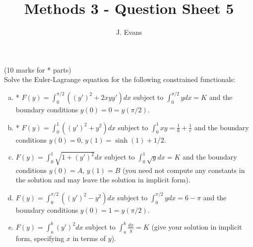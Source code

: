 \documentclass[12pt]{article}
\title{Methods 3 - Question Sheet 5}
\author{J. Evans}
\date{}
\begin{document}
\maketitle

\begin{question}(10 marks for * parts)\\
Solve the Euler-Lagrange equation for the following constrained functionals:
\begin{enumerate}[(a)]
\item * $F(y)=\int_0^{\pi/2}((y')^2+2xyy')dx$ subject to $\int_0^{\pi/2}ydx=K$ and the boundary conditions $y(0)=0=y(\pi/2)$.
\item * $F(y)=\int_0^1((y')^2+y^2)dx$ subject to $\int_0^1xy=\frac{1}{6}+\frac{1}{e}$ and the boundary conditions $y(0)=0$, $y(1)=\sinh(1)+1/2$.
\item $F(y)=\int_0^1\sqrt{1+(y')^2}dx$ subject to $\int_0^1\sqrt{y}dx=K$ and the boundary conditions $y(0)=A$, $y(1)=B$ (you need not compute any constants in the solution and may leave the solution in implicit form).
\item $F(y)=\int_0^{\pi/2}((y')^2-y^2)dx$ subject to $\int_0^{\pi/2}ydx=6-\pi$ and the boundary conditions $y(0)=1=y(\pi/2)$.
\item $F(y)=\int_a^b(y')^2dx$ subject to $\int_a^b\frac{dx}{y}=K$ (give your solution in implicit form, specifying $x$ in terms of $y$).
\end{enumerate}
\end{question}
\end{document}
